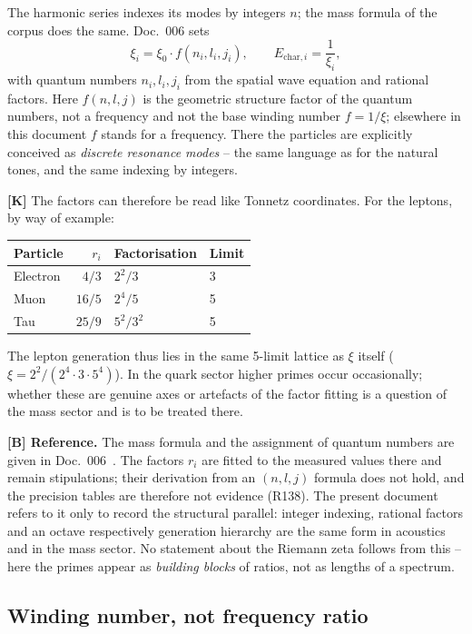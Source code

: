 The harmonic series indexes its modes by integers $n$; the mass formula
of the corpus does the same. Doc.~006 sets
\[
  \xi_i = \xi_0\cdot f(n_i, l_i, j_i),
  \qquad
  E_{\text{char},i} = \frac{1}{\xi_i},
\]
with quantum numbers $n_i, l_i, j_i$ from the spatial wave equation and
rational factors. Here $f(n,l,j)$ is the geometric structure factor of
the quantum numbers, not a frequency and not the base winding number
$f = 1/\xi$; elsewhere in this document $f$ stands for a frequency.
There the particles are explicitly conceived as
\emph{discrete resonance modes} -- the same language as for the natural
tones, and the same indexing by integers.



\textbf{[K]} The factors can therefore be read like Tonnetz
coordinates. For the leptons, by way of example:

\begin{center}
\begin{tabular}{lrll}
\toprule
Particle & $r_i$ & Factorisation & Limit \\
\midrule
Electron & $4/3$ & $2^2/3$ & 3 \\
Muon & $16/5$ & $2^4/5$ & 5 \\
Tau & $25/9$ & $5^2/3^2$ & 5 \\
\bottomrule
\end{tabular}
\end{center}

The lepton generation thus lies in the same 5-limit lattice as $\xi$
itself ($\xi = 2^2/(2^4\cdot3\cdot5^4)$). In the quark sector higher
primes occur occasionally; whether these are genuine axes or artefacts
of the factor fitting is a question of the mass sector and is to be
treated there.

\textbf{[B] Reference.} The mass formula and the assignment of quantum
numbers are given in Doc.~006~\cite{pascher_ffgft}. The factors $r_i$
are fitted to the measured values there and remain stipulations; their
derivation from an $(n,l,j)$ formula does not hold, and the precision
tables are therefore not evidence (R138). The present document refers to it
only to record the structural parallel: integer indexing, rational
factors and an octave respectively generation hierarchy are the same
form in acoustics and in the mass sector. No statement about the
Riemann zeta follows from this -- here the primes appear as
\emph{building blocks} of ratios, not as lengths of a spectrum.

\subsection{Winding number, not frequency ratio}

